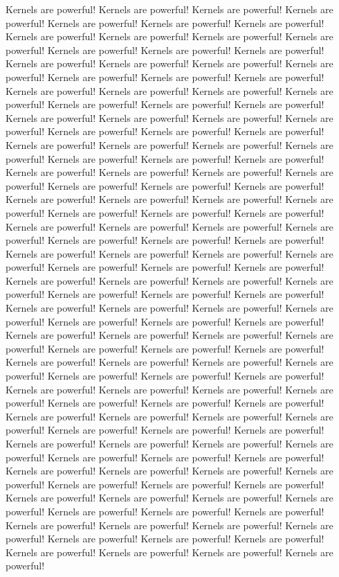 \documentclass[letterpaper]{article}
\begin{document}
Kernels are powerful! Kernels are powerful! Kernels are powerful! Kernels are powerful! Kernels are powerful! Kernels are powerful! Kernels are powerful! Kernels are powerful! Kernels are powerful! Kernels are powerful! Kernels are powerful! Kernels are powerful! Kernels are powerful! Kernels are powerful! Kernels are powerful! Kernels are powerful! Kernels are powerful! Kernels are powerful! Kernels are powerful! Kernels are powerful! Kernels are powerful! Kernels are powerful! Kernels are powerful! Kernels are powerful! Kernels are powerful! Kernels are powerful! Kernels are powerful! Kernels are powerful! Kernels are powerful! Kernels are powerful! Kernels are powerful! Kernels are powerful! Kernels are powerful! Kernels are powerful! Kernels are powerful! Kernels are powerful! Kernels are powerful! Kernels are powerful! Kernels are powerful! Kernels are powerful! Kernels are powerful! Kernels are powerful! Kernels are powerful! Kernels are powerful! Kernels are powerful! Kernels are powerful! Kernels are powerful! Kernels are powerful! Kernels are powerful! Kernels are powerful! Kernels are powerful! Kernels are powerful! Kernels are powerful! Kernels are powerful! Kernels are powerful! Kernels are powerful! Kernels are powerful! Kernels are powerful! Kernels are powerful! Kernels are powerful! Kernels are powerful! Kernels are powerful! Kernels are powerful! Kernels are powerful! Kernels are powerful! Kernels are powerful! Kernels are powerful! Kernels are powerful! Kernels are powerful! Kernels are powerful! Kernels are powerful! Kernels are powerful! Kernels are powerful! Kernels are powerful! Kernels are powerful! Kernels are powerful! Kernels are powerful! Kernels are powerful! Kernels are powerful! Kernels are powerful! Kernels are powerful! Kernels are powerful! Kernels are powerful! Kernels are powerful! Kernels are powerful! Kernels are powerful! Kernels are powerful! Kernels are powerful! Kernels are powerful! Kernels are powerful! Kernels are powerful! Kernels are powerful! Kernels are powerful! Kernels are powerful! Kernels are powerful! Kernels are powerful! Kernels are powerful! Kernels are powerful! Kernels are powerful! Kernels are powerful! Kernels are powerful! Kernels are powerful! Kernels are powerful! Kernels are powerful! Kernels are powerful! Kernels are powerful! Kernels are powerful! Kernels are powerful! Kernels are powerful! Kernels are powerful! Kernels are powerful! Kernels are powerful! Kernels are powerful! Kernels are powerful! Kernels are powerful! Kernels are powerful! Kernels are powerful! Kernels are powerful! Kernels are powerful! Kernels are powerful! Kernels are powerful! Kernels are powerful! Kernels are powerful! Kernels are powerful! Kernels are powerful! Kernels are powerful! Kernels are powerful! Kernels are powerful! Kernels are powerful! Kernels are powerful! Kernels are powerful! Kernels are powerful! Kernels are powerful! Kernels are powerful! Kernels are powerful! Kernels are powerful! Kernels are powerful! Kernels are powerful! Kernels are powerful! Kernels are powerful! Kernels are powerful! Kernels are powerful! Kernels are powerful! Kernels are powerful! 
\end{document}
